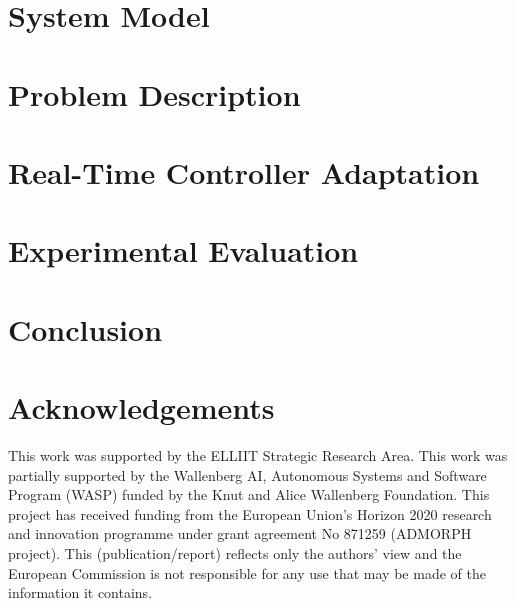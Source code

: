 \section{System Model}
\label{sec:sys-model}


\section{Problem Description}
\label{sec:problem-descr}


\section{Real-Time Controller Adaptation}
\label{sec:darc}


\section{Experimental Evaluation}
\label{sec:results}


\section{Conclusion}
\label{sec:conclusion}


\section*{Acknowledgements}
This work was supported by the ELLIIT Strategic Research Area.
This work was partially supported by the Wallenberg AI, Autonomous Systems and Software Program (WASP) funded by the Knut and Alice Wallenberg Foundation.
This project has received funding from the European Union's Horizon 2020 research and innovation programme under grant agreement No 871259 (ADMORPH project). This (publication/report) reflects only the authors' view and the European Commission is not responsible for any use that may be made of the information it contains.


\printbibliography[heading=subbibliography]
